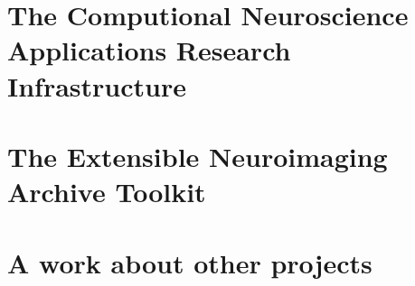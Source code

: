 \section{The Computional Neuroscience Applications Research Infrastructure}
\section{The Extensible Neuroimaging Archive Toolkit}
\section{A work about other projects}






